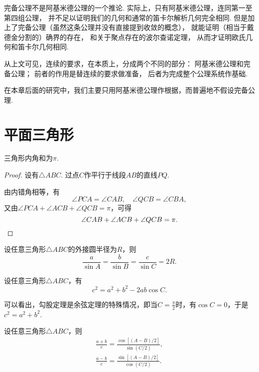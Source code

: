 完备公理不是阿基米德公理的一个推论.
实际上，只有阿基米德公理，连同第一至第四组公理，
并不足以证明我们的几何和通常的笛卡尔解析几何完全相同.
但是加上了完备公理（虽然这条公理并没有直接提到收敛的概念），
就能证明（相当于戴德金分割的）确界的存在，
和关于聚点存在的波尔查诺定理，
从而才证明欧氏几何和笛卡尔几何相同.

从上文可见，连续的要求，在本质上，分成两个不同的部分：
阿基米德公理和完备公理；
前者的作用是替连续的要求做准备，
后者为完成整个公理系统作基础.

在本章后面的研究中，我们主要只用阿基米德公理作根据，而普遍地不假设完备公理.

\section{平面三角形}

\begin{theorem}
三角形内角和为\(\pi\).
\begin{proof}
设有\(\triangle ABC\).
过点\(C\)作平行于线段\(AB\)的直线\(PQ\).

由内错角相等，有\[
\angle{PCA} = \angle{CAB}, \quad \angle{QCB} = \angle{CBA},
\]又由\(\angle{PCA}+\angle{ACB}+\angle{QCB}=\pi\)，可得\[
\angle{CAB}+\angle{ACB}+\angle{QCB}=\pi.
\qedhere
\]
\end{proof}
\end{theorem}

\begin{theorem}[正弦定理]
设任意三角形\(\triangle ABC\)的外接圆半径为\(R\)，则\begin{equation}
\frac{a}{\sin A}
= \frac{b}{\sin B}
= \frac{c}{\sin C}
= 2R.
\end{equation}
\end{theorem}

\begin{theorem}[余弦定理]
设任意三角形\(\triangle ABC\)，有\begin{equation}
c^2 = a^2 + b^2 - 2ab \cos C.
\end{equation}
\end{theorem}
可以看出，勾股定理是余弦定理的特殊情况，即当\(C = \frac{\pi}{2}\)时，有\(\cos C=0\)，于是\(c^2 = a^2 + b^2\).

\begin{theorem}[摩尔外德公式]
设任意三角形\(\triangle ABC\)，则\begin{gather}
	\frac{a+b}{c}
	= \frac{\cos[(A-B)/2]}{\sin(C/2)}, \\
	\frac{a-b}{c}
	= \frac{\sin[(A-B)/2]}{\cos(C/2)}.
\end{gather}
\end{theorem}

